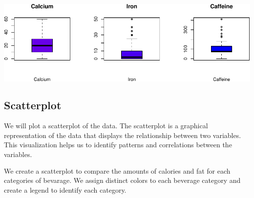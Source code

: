 \documentclass[
]{article}
\begin{document}
\begin{center}\includegraphics{Statistical_Learning_Final_Report_files/figure-latex/boxplot-3} \end{center}

\subsection{Scatterplot}\label{scatterplot}

We will plot a scatterplot of the data. The scatterplot is a graphical
representation of the data that displays the relationship between two
variables. This visualization helps us to identify patterns and
correlations between the variables.

We create a scatterplot to compare the amounts of calories and fat for
each categories of bevarage. We assign distinct colors to each beverage
category and create a legend to identify each category.
\end{document}
